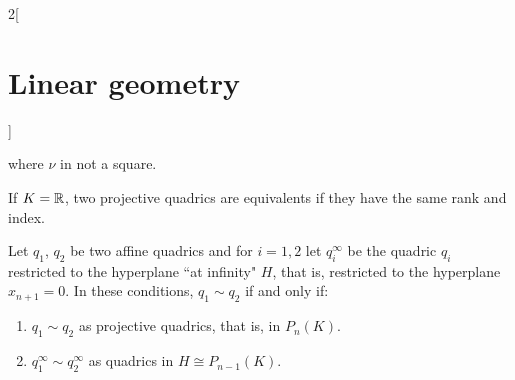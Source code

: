 \documentclass[../../../main.tex]{subfiles}
\begin{document}
\begin{multicols}{2}[\section{Linear geometry}]
\begin{theorem}
\begin{itemize}
                  where $\nu$ in not a square.
        \end{itemize}
    \end{theorem}
    \begin{theorem}
        If $K=\mathbb{R} $, two projective quadrics are equivalents if they have the same rank and index.
    \end{theorem}
    \begin{theorem}
        Let $q_1$, $q_2$ be two affine quadrics and for $i=1,2$ let $q_i^\infty$ be the quadric $q_i$ restricted to the hyperplane ``at infinity" $H$, that is, restricted to the hyperplane $x_{n+1}=0$. In these conditions, $q_1\sim q_2$ if and only if:
        \begin{enumerate}
            \item $q_1\sim q_2$ as projective quadrics, that is, in $P_n(K)$.
            \item $q_1^\infty\sim q_2^\infty$ as quadrics in $H\cong P_{n-1}(K)$.
        \end{enumerate}
    \end{theorem}
\end{multicols}
\end{document}
